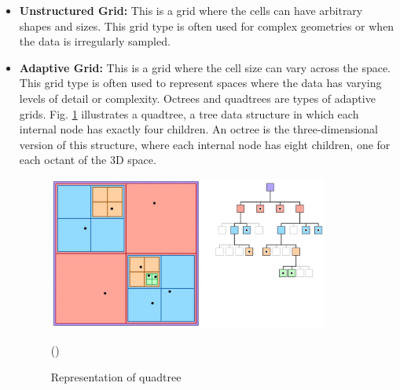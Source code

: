 \begin{itemize}
    \item \textbf{Unstructured Grid:} This is a grid where the cells can have arbitrary shapes and sizes. This grid type is often used for complex geometries or when the data is irregularly sampled.
    \vspace{1.5mm}

    \item \textbf{Adaptive Grid:} This is a grid where the cell size can vary across the space. This grid type is often used to represent spaces where the data has varying levels of detail or complexity. Octrees and quadtrees are types of adaptive grids. Fig. \ref{fig:quadtree} illustrates a quadtree, a tree data structure in which each internal node has exactly four children. An octree is the three-dimensional version of this structure, where each internal node has eight children, one for each octant of the 3D space.

    \begin{figure}
    \centering
    \includegraphics[height=0.45\textwidth,width=0.87\textwidth]{Figures/quadtree.jpeg}
    \decoRule
    \caption{Representation of quadtree}(\cite{image_quadtree})
    \label{fig:quadtree}
    \end{figure}
    

\end{itemize}
